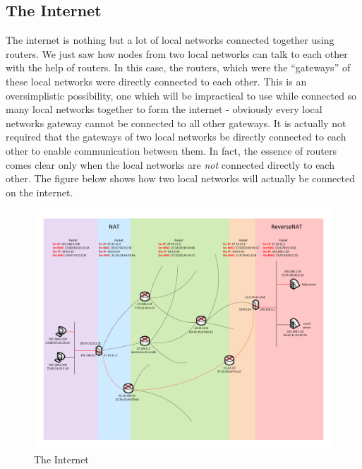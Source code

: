 \subsection{The Internet}
The internet is nothing but a lot of local networks connected together using routers. We just saw how nodes from two local networks can talk to each other with the help of routers. In this case, the routers, which were the ``gateways'' of these local networks were directly connected to each other. This is an oversimplistic possibility, one which will be impractical to use while connected so many local networks together to form the internet - obviously every local networks gateway cannot be connected to all other gateways. It is actually not required that the gateways of two local networks be directly connected to each other to enable communication between them. In fact, the essence of routers comes clear only when the local networks are \emph{not} connected directly to each other. The figure below shows how two local networks will actually be connected on the internet.

	\begin{figure}[h]
	\centerfloat
	\includegraphics{partNW/internet}
	\caption{The Internet}
	\label{fig:internet}
	\end{figure}

